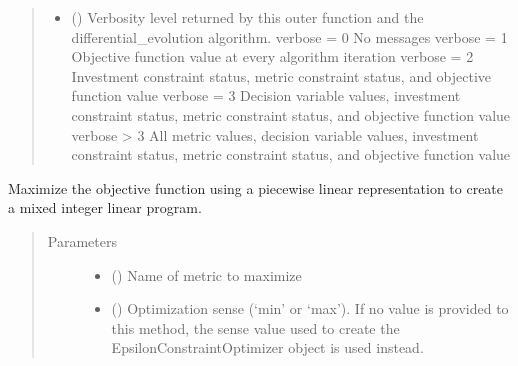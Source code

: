 \documentclass[letterpaper,10pt,english]{sphinxmanual}
\begin{document}
\begin{fulllineitems}
\begin{fulllineitems}
\begin{quote}
\begin{description}
\begin{itemize}
\item {} 
 () \textendash{} Verbosity level returned by this outer function and the
differential\_evolution algorithm.
verbose = 0     No messages
verbose = 1     Objective function value at every algorithm iteration
verbose = 2     Investment constraint status, metric constraint status,
and objective function value
verbose = 3     Decision variable values, investment constraint status,
metric constraint status, and objective function value
verbose \textgreater{} 3     All metric values, decision variable values, investment
constraint status, metric constraint status, and
objective function value

\end{itemize}

\end{description}\end{quote}

\end{fulllineitems}


\begin{fulllineitems}
\label{\detokenize{tyche:tyche.EpsilonConstraints.EpsilonConstraintOptimizer.opt_milp}}
Maximize the objective function using a piecewise linear
representation to create a mixed integer linear program.
\begin{quote}\begin{description}
\item[{Parameters}] \leavevmode\begin{itemize}
\item {} 
 () \textendash{} Name of metric to maximize

\item {} 
 () \textendash{} Optimization sense (‘min’ or ‘max’). If no value is provided to this
method, the sense value used to create the EpsilonConstraintOptimizer
object is used instead.


\end{itemize}
\end{description}
\end{quote}
\end{fulllineitems}
\end{fulllineitems}
\end{document}
